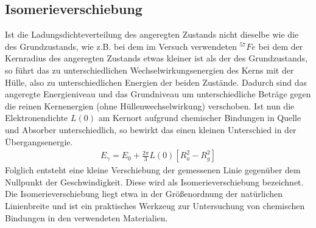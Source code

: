 \documentclass[12pt]{article}
\begin{document}
\subsection{Isomerieverschiebung}
Ist die Ladungsdichteverteilung des angeregten Zustands nicht dieselbe wie die des Grundzustands, wie z.B. bei dem im Versuch verwendeten $^{57}Fe$ bei dem der Kernradius
des angeregten Zustands etwas kleiner ist als der des Grundzustands, so führt das zu unterschiedlichen Wechselwirkungsenergien des Kerns mit
der Hülle, also zu unterschiedlichen Energien der beiden Zustände. Dadurch sind das angeregte Energieniveau und das Grundniveau um unterschiedliche Beträge gegen die
reinen Kernenergien (ohne Hüllenwechselwirkung) verschoben. Ist nun die Elektronendichte $L(0)$ am Kernort aufgrund chemischer Bindungen in Quelle und Absorber unterschiedlich,
so bewirkt das einen kleinen Unterschied in der Übergangsenergie.
\begin{align}
 E_\gamma = E_0 + \frac{2\pi}{3} L(0) \left[ R_a^2 - R_g^2\right]
\end{align}
Folglich entsteht eine kleine Verschiebung der gemessenen Linie gegenüber dem Nullpunkt der Geschwindigkeit. Diese wird als Isomerieverschiebung bezeichnet. Die Isomerieverschiebung
liegt etwa in der Größenordnung der natürlichen Linienbreite und ist ein praktisches Werkzeug zur Untersuchung von chemischen Bindungen in den verwendeten Materialien.
\end{document}
